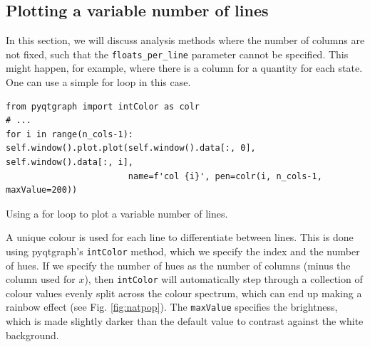 \documentclass[12pt]{article}
\newenvironment{code}{\captionsetup{type=listing}}{\par\addvspace{\baselineskip}}
\begin{document}
\subsection{Plotting a variable number of lines}\label{ssec:variable}

In this section, we will discuss analysis methods where the number of columns are not fixed, such that the \texttt{floats\_per\_line} parameter cannot be specified. This might happen, for example, where there is a column for a quantity for each state. One can use a simple for loop in this case.
\begin{code}\begin{verbatim}
from pyqtgraph import intColor as colr
# ...
for i in range(n_cols-1):
self.window().plot.plot(self.window().data[:, 0], self.window().data[:, i],
                        name=f'col {i}', pen=colr(i, n_cols-1, maxValue=200))
\end{verbatim}
\caption{Using a for loop to plot a variable number of lines.}
\label{lst:colr}
\end{code}

A unique colour is used for each line to differentiate between lines. This is done using pyqtgraph's \texttt{intColor} method, which we specify the index and the number of hues. If we specify the number of hues as the number of columns (minus the column used for \(x\)), then \texttt{intColor} will automatically step through a collection of colour values evenly split across the colour spectrum, which can end up making a rainbow effect (see Fig. \ref{fig:natpop}). The \texttt{maxValue} specifies the brightness, which is made slightly darker than the default value to contrast against the white background.
\end{document}
